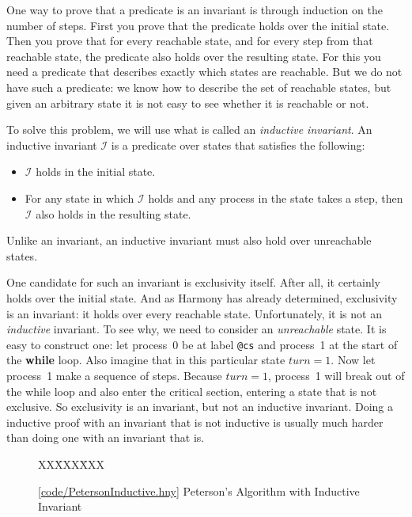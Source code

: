 \documentclass{report}
\newcommand{\harmonysource}[1]{
\begin{tabbing}
XX\=XXX\=XXX\kill
    
\end{tabbing}
}
\newcommand{\harmonylink}[1]{%
[\href{https://www.cs.cornell.edu/home/rvr/harmony/#1}{\underline{#1}}]%
}
\newenvironment{code}{
\tcolorbox
}{
\endtcolorbox
}
\begin{document}
One way to prove that a predicate is an invariant is through induction
on the number of steps.  First you prove that the predicate holds over
the initial state.  Then you prove that for every reachable state,
and for every step from that reachable state, the predicate also holds
over the resulting state.
For this you need a predicate that describes exactly which
states are reachable.
But we do not have such a predicate: we know how to describe the set
of reachable states, but given an arbitrary state it is not easy to
see whether it is reachable or not.

To solve this problem, we will use what is called an
\emph{inductive invariant}.
%
An inductive invariant $\mathcal{I}$ is a predicate over states that satisfies the following:
\begin{itemize}
\item $\mathcal{I}$ holds in the initial state.
\item For any state in which $\mathcal{I}$ holds and any process in the
state takes a step, then $\mathcal{I}$ also holds in the resulting state.
\end{itemize}
Unlike an invariant, an inductive invariant must also hold over unreachable states.

One candidate for such an invariant is exclusivity itself.
After all, it certainly holds over the initial state.
And as Harmony has already determined, exclusivity is an invariant:
it holds over every reachable state.
Unfortunately, it is not an \emph{inductive} invariant.
To see why, we need to consider an \emph{unreachable} state.
It is easy to construct one: let process~0 be at label \texttt{@cs}
and process~1 at the start of the \textbf{while} loop.
Also imagine that in this particular state $\mathit{turn} = 1$.  Now let
process~1 make a sequence of steps.  Because $\mathit{turn} = 1$,
process~1 will break out of the while loop and also enter the critical
section, entering a state that is not exclusive.
So exclusivity is an invariant, but not an inductive invariant.
Doing a inductive proof with an invariant that is not inductive is usually
much harder than doing one with an invariant that is.

\begin{figure}
\begin{code}
\harmonysource{PetersonInductive}
\end{code}
\caption{\harmonylink{code/PetersonInductive.hny} Peterson's Algorithm with Inductive Invariant}
\label{fig:petersonproof}
\end{figure}
\end{document}
